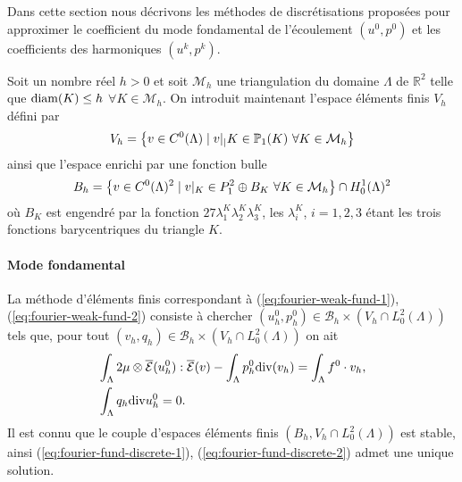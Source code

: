 Dans cette section nous décrivons les méthodes de discrétisations
proposées pour approximer le coefficient du mode fondamental de
l'écoulement $(u^0, p^0)$ et les coefficients des harmoniques $(u^k,
p^k)$.

Soit un nombre réel $h > 0$ et soit $\mathcal M_h$ une triangulation
du domaine $\Lambda$ de $\mathbb R^2$ telle que $\operatorname{diam}(K)\leq h$
$\forall K\in \mathcal M_h$. On introduit maintenant l'espace
éléments finis $V_h$ défini par
\begin{equation}
  V_h = \left\{ v\in C^0(\Lambda)\mid v|_|K \in \mathbb
    P_1(K)\ \forall K\in\mathcal M_h \right\}
\end{equation}
ainsi que l'espace enrichi par une fonction bulle
\begin{equation}
  B_h = \left\{ v \in C^0(\Lambda)^2 \mid v|_K \in P_1^2\oplus
    B_K\ \forall K\in\mathcal M_h \right\} \cap H_0^1(\Lambda)^2
\end{equation}
où $B_K$ est engendré par la fonction $27 \lambda_1^K
\lambda_2^K\lambda_3^K$, les $\lambda_i^K$, $i = 1,2,3$ étant les
trois fonctions barycentriques du triangle $K$.

\paragraph{Mode fondamental}
La méthode d'éléments finis correspondant à
(\ref{eq:fourier-weak-fund-1}), (\ref{eq:fourier-weak-fund-2})
consiste à chercher $(u^0_h, p^0_h)\in \mathcal B_h\times(V_h \cap
L^2_0(\Lambda))$ tels que, pour tout $(v_h, q_h)\in \mathcal
B_h\times(V_h \cap L^2_0(\Lambda))$ on ait
\begin{align}
  &\int_\Lambda
  2\mu\otimes\overline{\mathcal E}(u^0_h):\overline{\mathcal E}(v)
  -\int_\Lambda p^0_h\mathrm{div}(v_h) = \int_\Lambda f^0\cdot v_h, \label{eq:fourier-fund-discrete-1}\\
  & \int_\Lambda q_h\mathrm{div} u^0_h = 0.\label{eq:fourier-fund-discrete-2}
\end{align}
Il est connu que le couple d'espaces éléments finis $(B_h, V_h \cap
L^2_0(\Lambda))$ est stable, ainsi (\ref{eq:fourier-fund-discrete-1}),
(\ref{eq:fourier-fund-discrete-2}) admet une unique solution.

